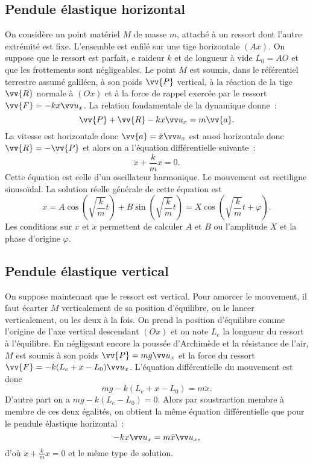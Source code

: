 \subsection{Pendule élastique horizontal}
\label{chap3-subsec:pendulehorizontal}
On considère un point matériel $M$ de masse $m$, attaché à un ressort dont l'autre extrémité est fixe. L'ensemble est enfilé sur une tige horizontale $(Ax)$. On suppose que le ressort est parfait, e raideur $k$ et de longueur à vide $L_0=AO$ et que les frottements sont négligeables. Le point $M$ est soumis, dans le référentiel terrestre assumé galiléen, à son poids $\vv{P}$ vertical, à la réaction de la tige $\vv{R}$ normale à $(Ox)$ et à la force de rappel exercée par le ressort $\vv{F}=-kx\ux$. La relation fondamentale de la dynamique donne~:
\begin{equation}
  \vv{P}+\vv{R}-kx\ux = m\vv{a}.
\end{equation}
La vitesse est horizontale donc $\vv{a} = \ddot{x}\ux$ est aussi horizontale donc $\vv{R}=-\vv{P}$ et alors on a l'équation différentielle suivante~:
\begin{equation}
  \ddot{x} +\frac{k}{m}x=0.
\end{equation}
Cette équation est celle d'un oscillateur harmonique. Le mouvement est rectiligne sinusoïdal. La solution réelle générale de cette équation est
\begin{equation}
  x = A \cos\left(\sqrt{\frac{k}{m}} t\right) + B \sin\left(\sqrt{\frac{k}{m}} t\right) = X \cos\left(\sqrt{\frac{k}{m}} t + \varphi\right).
\end{equation}
Les conditions sur $x$ et $\dot{x}$ permettent de calculer $A$ et $B$ ou l'amplitude $X$ et la phase d'origine $\varphi$.

\subsection{Pendule élastique vertical}
\label{chap3-subsec:pendulevertical}
On suppose maintenant que le ressort est vertical. Pour amorcer le mouvement, il faut écarter $M$ verticalement de sa position d'équilibre, ou le lancer verticalement, ou les deux à la fois. On prend la position d'équilibre comme l'origine de l'axe vertical descendant $(Ox)$ et on note $L_e$ la longueur du ressort à l'équilibre. En négligeant encore la poussée d'Archimède et la résistance de l'air, $M$ est soumis à son poids $\vv{P}=mg\ux$ et la force du ressort $\vv{F}=-k(L_e +x-L_0)\ux$. L'équation différentielle du mouvement est donc
\begin{equation}
  mg -k(L_e +x-L_0) = m\ddot{x}.
\end{equation}
D'autre part on a $ mg-k(L_e-L_0)=0$. Alors par soustraction membre à membre de ces deux égalités, on obtient la même équation différentielle que pour le pendule élastique horizontal~:
\begin{equation}
  -kx \ux = m \ddot{x} \ux,
\end{equation}
d'où $\ddot{x} +\frac{k}{m}x=0$ et le même type de solution.

